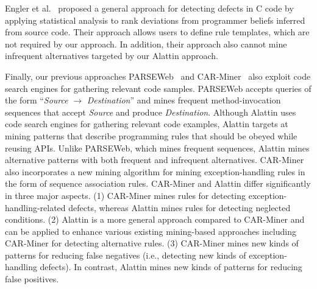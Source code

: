 Engler et al.~\cite{Engler2001deviant} proposed a general approach for detecting defects in C code by applying statistical analysis to rank deviations from programmer beliefs inferred from source code. Their approach allows users to define rule templates, which are not required by our approach. In addition, their approach also cannot mine infrequent alternatives targeted by our Alattin approach.

Finally, our previous approaches PARSEWeb~\cite{thummalapenta07:parseweb} and CAR-Miner~\cite{thummalapenta09:mining} also exploit code search engines for gathering relevant code samples. PARSEWeb accepts queries of the form ``\emph{Source} $\rightarrow$ \emph{Destination}'' and mines frequent method-invocation sequences that accept \emph{Source} and produce \emph{Destination}. Although Alattin uses code search engines for gathering relevant code examples, Alattin targets at mining patterns that describe programming rules that should be obeyed while reusing APIs. Unlike PARSEWeb, which mines frequent sequences, Alattin mines alternative patterns with both frequent and infrequent alternatives. CAR-Miner also incorporates a new mining algorithm for mining exception-handling rules in the form of sequence association rules. CAR-Miner and Alattin differ significantly in three major aspects. (1) CAR-Miner mines rules for detecting exception-handling-related defects, whereas Alattin mines rules for detecting neglected conditions. (2) Alattin is a more general approach compared to CAR-Miner and can be applied to enhance various existing mining-based approaches including CAR-Miner for detecting alternative rules. (3) CAR-Miner mines new kinds of patterns for reducing false negatives (i.e., detecting new kinds of exception-handling defects). In contrast, Alattin mines new kinds of  patterns for reducing false positives. 

